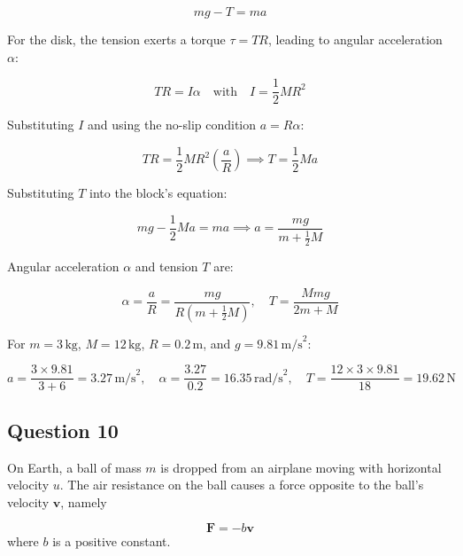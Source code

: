\documentclass{article}
\begin{document}
\[
mg - T = ma
\]

For the disk, the tension exerts a torque \( \tau = TR \), leading to angular acceleration \( \alpha \):

\[
TR = I\alpha \quad \text{with} \quad I = \frac{1}{2}MR^2
\]

Substituting \( I \) and using the no-slip condition \( a = R\alpha \):

\[
TR = \frac{1}{2}MR^2 \left(\frac{a}{R}\right) \implies T = \frac{1}{2}Ma
\]

Substituting \( T \) into the block's equation:

\[
mg - \frac{1}{2}Ma = ma \implies a = \frac{mg}{m + \frac{1}{2}M}
\]

Angular acceleration \( \alpha \) and tension \( T \) are:

\[
\alpha = \frac{a}{R} = \frac{mg}{R\left(m + \frac{1}{2}M\right)}, \quad T = \frac{Mmg}{2m + M}
\]

For \( m = 3\,\text{kg} \), \( M = 12\,\text{kg} \), \( R = 0.2\,\text{m} \), and \( g = 9.81\,\text{m/s}^2 \):

\[
a = \frac{3 \times 9.81}{3 + 6} = 3.27\,\text{m/s}^2, \quad \alpha = \frac{3.27}{0.2} = 16.35\,\text{rad/s}^2, \quad T = \frac{12 \times 3 \times 9.81}{18} = 19.62\,\text{N}
\]


\subsection{Question 10}

On Earth, a ball of mass $m$ is dropped from an airplane moving with horizontal velocity $u$. The air resistance on the ball causes a force opposite to the ball's velocity $\mathbf{v}$, namely

\[
\mathbf{F} = -b \mathbf{v}
\]
where $b$ is a positive constant. \\
\end{document}

